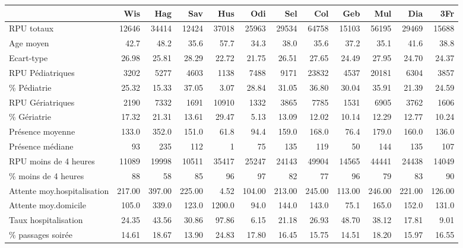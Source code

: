 \documentclass[12pt,english,french,twoside]{book}\usepackage[]{graphicx}\usepackage[]{color}
\begin{document}
\begin{landscape}
\begin{table}[ht]
\centering
\begin{tabular}{lrrrrrrrrrrr}
  \hline
 & Wis & Hag & Sav & Hus & Odi & Sel & Col & Geb & Mul & Dia & 3Fr \\ 
  \hline
RPU totaux & 12646 & 34414 & 12424 & 37018 & 25963 & 29534 & 64758 & 15103 & 56195 & 29469 & 15688 \\ 
  Age moyen & 42.7 & 48.2 & 35.6 & 57.7 & 34.3 & 38.0 & 35.6 & 37.2 & 35.1 & 41.6 & 38.8 \\ 
  Ecart-type & 26.98 & 25.81 & 28.29 & 22.72 & 21.75 & 26.51 & 27.65 & 24.49 & 27.95 & 24.70 & 24.37 \\ 
  RPU Pédiatriques &  3202 &  5277 &  4603 &  1138 &  7488 &  9171 & 23832 &  4537 & 20181 &  6304 &  3857 \\ 
  \% Pédiatrie & 25.32 & 15.33 & 37.05 &  3.07 & 28.84 & 31.05 & 36.80 & 30.04 & 35.91 & 21.39 & 24.59 \\ 
  RPU Gériatriques &  2190 &  7332 &  1691 & 10910 &  1332 &  3865 &  7785 &  1531 &  6905 &  3762 &  1606 \\ 
  \% Gériatrie & 17.32 & 21.31 & 13.61 & 29.47 &  5.13 & 13.09 & 12.02 & 10.14 & 12.29 & 12.77 & 10.24 \\ 
  Présence moyenne & 133.0 & 352.0 & 151.0 &  61.8 &  94.4 & 159.0 & 168.0 &  76.4 & 179.0 & 160.0 & 136.0 \\ 
  Présence médiane &  93 & 235 & 112 &   1 &  75 & 135 & 119 &  50 & 144 & 135 & 107 \\ 
  RPU moins de 4 heures & 11089 & 19998 & 10511 & 35417 & 25247 & 24143 & 49904 & 14565 & 44441 & 24438 & 14049 \\ 
  \% moins de 4 heures & 88 & 58 & 85 & 96 & 97 & 82 & 77 & 96 & 79 & 83 & 90 \\ 
  Attente moy.hospitalisation & 217.00 & 397.00 & 225.00 &   4.52 & 104.00 & 213.00 & 245.00 & 113.00 & 246.00 & 221.00 & 126.00 \\ 
  Attente moy.domicile &  105.0 &  339.0 &  123.0 & 1200.0 &   94.0 &  144.0 &  143.0 &   75.1 &  165.0 &  152.0 &  131.0 \\ 
  Taux hospitalisation & 24.35 & 43.56 & 30.86 & 97.86 &  6.15 & 21.18 & 26.93 & 48.70 & 38.12 & 17.81 &  9.01 \\ 
  \% passages soirée & 14.61 & 18.67 & 13.90 & 24.83 & 17.80 & 16.45 & 15.75 & 14.51 & 18.20 & 15.97 & 16.55 \\ 

\end{tabular}
\end{table}
\end{landscape}
\end{document}
